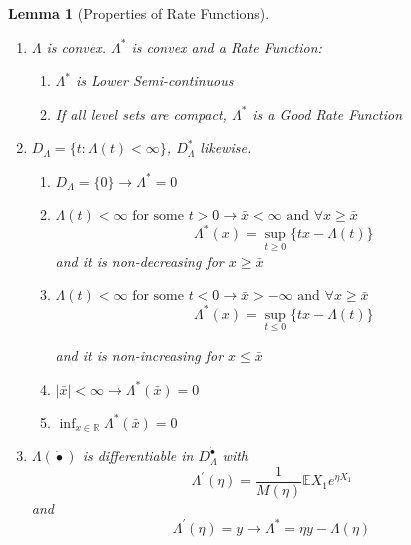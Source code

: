 \documentclass[11pt]{article}
\theoremstyle{break}
\newtheorem{lem}{Lemma}[section]
\newcommand{\re}{{\mathbb{R}}}
\newcommand{\ep}{{\mathbb{E}}}
\begin{document}
\begin{lem}[Properties of Rate Functions]
\leavevmode
\begin{enumerate}
\item \(\Lambda\) is convex. \(\Lambda^*\) is convex and a Rate Function:
\begin{enumerate}

\item \(\Lambda^*\) is Lower Semi-continuous 

\item If all level sets are compact, \(\Lambda^*\) is a Good Rate Function

\end{enumerate}

\item \(D_\Lambda = \{t: \Lambda(t) < \infty\}\), \(D_\Lambda^*\) likewise.

\begin{enumerate}
\item \(D_\Lambda = \{0\} \rightarrow \Lambda^* = 0\) 

\item \(\Lambda(t) < \infty \text{ for some } t>0 \rightarrow \bar{x}<\infty \text{ and } \forall x \geq \bar{x}\)
\begin{equation}
\Lambda^*(x) = \sup_{t\geq 0}\{tx - \Lambda(t)\}
\end{equation}
and it is non-decreasing for \(x\geq \bar{x}\)

\item \(\Lambda(t) < \infty \text{ for some } t<0 \rightarrow \bar{x}>-\infty \text{ and } \forall x \geq \bar{x}\)
\begin{equation}
\Lambda^*(x) = \sup_{t\leq 0}\{tx - \Lambda(t)\}
\end{equation}

and it is non-increasing for \(x\leq \bar{x}\)

\item \(\mid \bar{x} \mid < \infty \rightarrow \Lambda^*(\bar{x}) = 0\)

\item \(\inf_{x \in \re} \Lambda^*(\bar{x}) = 0\)
\end{enumerate}
\item \(\Lambda(\dot{•})\) is differentiable in \(D_\Lambda^{\dot{•}}\) with 
\begin{equation}
\Lambda^{'}(\eta) = \frac{1}{M(\eta)}\ep{X_1e^{\eta X_1}}
\end{equation}
and
\begin{equation}
\Lambda^{'}(\eta) = y \rightarrow \Lambda^* = \eta y - \Lambda(\eta)
\end{equation}
\end{enumerate}
\end{lem}
\end{document}
